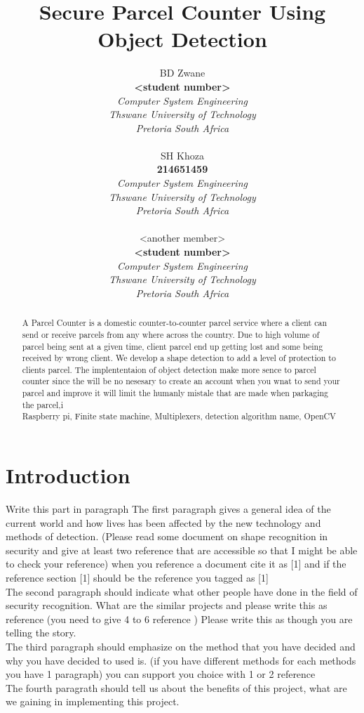\documentclass[10pt,sigconf, review]{article}
\title{ \huge Secure Parcel Counter Using Object Detection}
\author{BD Zwane \\
  \textbf{<student number>}\\
  \em{Computer System Engineering}\\
  \em{Thswane University of Technology}\\
  \em{Pretoria South Africa}\\

  \And

  SH Khoza \\
  \textbf{214651459}\\
  \em{Computer System Engineering}\\
  \em{Thswane University of Technology}\\
  \em{Pretoria South Africa}\\

  \And 

  <another member> \\
  \textbf{<student number>}\\
  \em{Computer System Engineering}\\
  \em{Thswane University of Technology}\\
  \em{Pretoria South Africa}\\}
\date{}
\begin{document}
\maketitle

\begin{abstract}
A Parcel Counter is a domestic counter-to-counter parcel service where a client
can send or receive parcels from any where across the country. Due to high 
volume of parcel being sent at a given time, client parcel end up getting lost 
and some being received by wrong client. We develop a shape detection to add 
a level of protection to clients parcel. The implententaion of object detection
make more sence to parcel counter since the will be no nesesary to create an
account when you wnat to send your parcel and improve it will limit the humanly
mistale that are made when parkaging the parcel,i\\ 

Raspberry pi, Finite state machine, Multiplexers, detection algorithm
name, OpenCV

\end{abstract}

\section{Introduction}

Write this part in  paragraph
The first paragraph gives a general idea of the current world and how lives has
been affected by the new technology and methods of detection. (Please read some
document on shape recognition in security and give at least two reference that
are accessible so that I might be able to check your reference) when you
reference a document cite it as [1] and if the reference section [1] should be
the reference you tagged as [1]\\

The second paragraph should indicate what other people have done in the field
of security recognition. What are the  similar projects and please write this
as reference (you need to give 4 to 6 reference ) Please write this as though
you are telling the story.\\

The third paragraph should emphasize on the method that you have decided and
why you have decided to used is. (if you have different methods for each
methods you have 1 paragraph) you can support you choice with 1 or 2
reference\\

The fourth paragrath should tell us about the benefits of this project, what
are we gaining in implementing this project.\\
\end{document}
